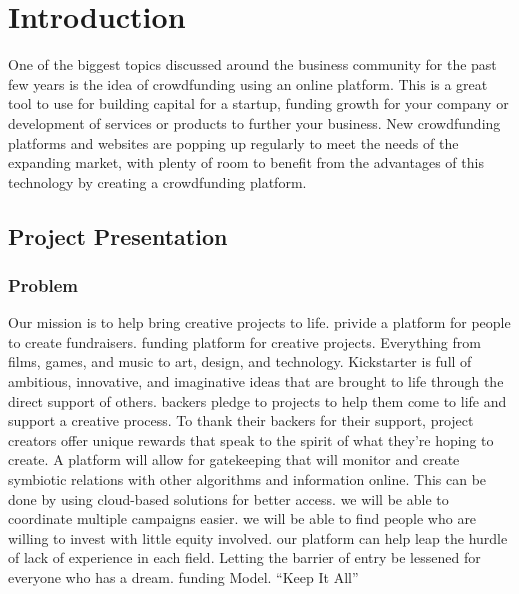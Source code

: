 

\setcounter{mtc}{6}

\chapter*{Introduction}
\label{chap:general_intorduction}
\minitoc
{}%
%

One of the biggest topics discussed around the business community for the past few years is the idea of crowdfunding using an online platform. This is a great tool to use for building capital for a startup, funding growth for your company or development of services or products to further your business.
New crowdfunding platforms and websites are popping up regularly to meet the needs of the expanding market, with plenty of room to benefit from the advantages of this technology by creating a crowdfunding platform.

\section*{ Project Presentation }
\subsection*{Problem}
Our mission is to help bring creative projects to life.
privide a platform for people to create fundraisers.
funding platform for creative projects. Everything from films, games, and music to art, design, and technology. Kickstarter is full of ambitious, innovative, and imaginative ideas that are brought to life through the direct support of others.
backers pledge to projects to help them come to life and support a creative process. To thank their backers for their support, project creators offer unique rewards that speak to the spirit of what they're hoping to create.
A platform will allow for gatekeeping that will monitor and create symbiotic relations with other algorithms and information online. This can be done by using cloud-based solutions for better access.
we will be able to coordinate multiple campaigns easier.
we will be able to find people who are willing to invest with little equity involved.
our platform can help leap the hurdle of lack of experience in each field. Letting the barrier of entry be lessened for everyone who has a dream.
funding Model.
“Keep It All”
